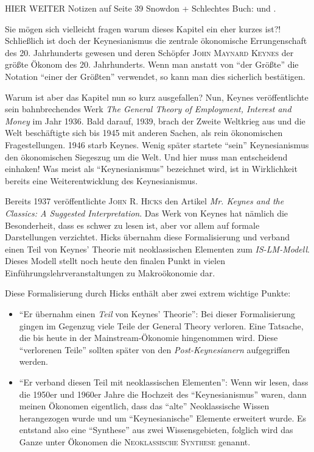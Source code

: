 HIER WEITER
Notizen auf Seite 39 Snowdon +
Schlechtes Buch: \textcite{Samuelson1946} und \textcite[S. 56]{Snowdon2005}. 

Sie mögen sich vielleicht fragen warum dieses Kapitel ein eher kurzes ist?! Schließlich ist doch der Keynesianismus die zentrale ökonomische Errungenschaft des 20. Jahrhunderts gewesen und deren Schöpfer \textsc{John Maynard Keynes} der größte Ökonom des 20. Jahrhunderts. Wenn man anstatt von "`der Größte"' die Notation "`einer der Größten"' verwendet, so kann man dies sicherlich bestätigen.

Warum ist aber das Kapitel nun so kurz ausgefallen? Nun, Keynes veröffentlichte sein bahnbrechendes Werk \textit{The General Theory of Employment, Interest and Money} im Jahr 1936. Bald darauf, 1939, brach der Zweite Weltkrieg aus und die Welt beschäftigte sich bis 1945 mit anderen Sachen, als rein ökonomischen Fragestellungen. 1946 starb Keynes. Wenig später startete "`sein"' Keynesianismus den ökonomischen Siegeszug um die Welt. Und hier muss man entscheidend einhaken! Was meist als "`Keynesianismus"' bezeichnet wird, ist in Wirklichkeit bereits eine Weiterentwicklung des Keynesianismus.

Bereits 1937 veröffentlichte \textsc{John R. Hicks} den Artikel \textit{Mr. Keynes and the Classics: A Suggested Interpretation}. Das Werk von Keynes hat nämlich die Besonderheit, dass es schwer zu lesen ist, aber vor allem auf formale Darstellungen verzichtet. Hicks übernahm diese Formalisierung und verband einen Teil von Keynes' Theorie mit neoklassischen Elementen zum \textit{IS-LM-Modell}. Dieses Modell stellt noch heute den finalen Punkt in vielen Einführungslehrveranstaltungen zu Makroökonomie dar.

Diese Formalisierung durch Hicks enthält aber zwei extrem wichtige Punkte:
\begin{itemize}
	\item "`Er übernahm einen \textit{Teil} von Keynes' Theorie"': Bei dieser Formalisierung gingen im Gegenzug viele Teile der General Theory verloren. Eine Tatsache, die bis heute in der Mainstream-Ökonomie hingenommen wird. Diese "`verlorenen Teile"' sollten später von den \textit{Post-Keynesianern} aufgegriffen werden.
	\item "`Er verband diesen Teil mit neoklassischen Elementen"': Wenn wir lesen, dass die 1950er und 1960er Jahre die Hochzeit des "`Keynesianismus"' waren, dann meinen Ökonomen eigentlich, dass das "`alte"' Neoklassische Wissen herangezogen wurde und um "`Keynesianische"' Elemente erweitert wurde. Es entstand also eine "`Synthese"' aus zwei Wissensgebieten, folglich wird das Ganze unter Ökonomen die \textsc{Neoklassische Synthese} genannt.
\end{itemize}


